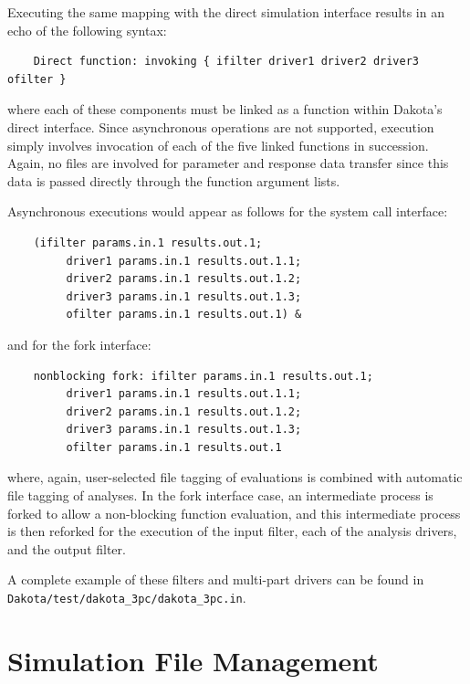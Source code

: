Executing the same mapping with the direct simulation interface
results in an echo of the following syntax:
\begin{small}
\begin{verbatim}
    Direct function: invoking { ifilter driver1 driver2 driver3 ofilter }
\end{verbatim}
\end{small}

where each of these components must be linked as a function within
Dakota's direct interface. Since asynchronous operations are not
supported, execution simply involves invocation of each of the five
linked functions in succession. Again, no files are involved for
parameter and response data transfer since this data is passed
directly through the function argument lists.

Asynchronous executions would appear as follows for the system call
interface:
\begin{small}
\begin{verbatim}
    (ifilter params.in.1 results.out.1;
         driver1 params.in.1 results.out.1.1;
         driver2 params.in.1 results.out.1.2;
         driver3 params.in.1 results.out.1.3;
         ofilter params.in.1 results.out.1) &
\end{verbatim}
\end{small}

and for the fork interface:
\begin{small}
\begin{verbatim}
    nonblocking fork: ifilter params.in.1 results.out.1;
         driver1 params.in.1 results.out.1.1;
         driver2 params.in.1 results.out.1.2;
         driver3 params.in.1 results.out.1.3;
         ofilter params.in.1 results.out.1
\end{verbatim}
\end{small}

where, again, user-selected file tagging of evaluations is combined
with automatic file tagging of analyses. In the fork interface case,
an intermediate process is forked to allow a non-blocking function
evaluation, and this intermediate process is then reforked for the
execution of the input filter, each of the analysis drivers, and the
output filter.

A complete example of these filters and multi-part drivers can be
found in \texttt{Dakota/test/dakota\_3pc/dakota\_3pc.in}.

\section{Simulation File Management}\label{interfaces:file}


